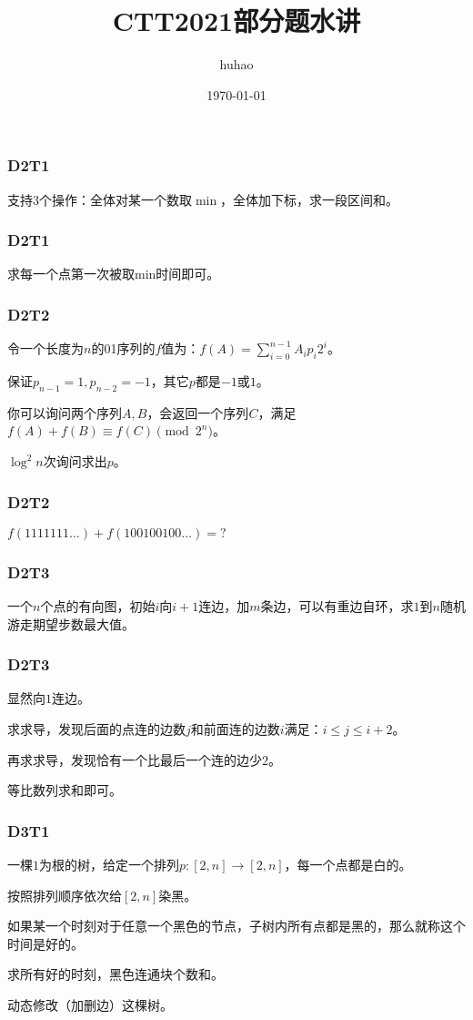 \documentclass[10pt]{beamer}
\begin{document}
	\title{CTT2021部分题水讲}
	\date{\today}
	\author{huhao}
	\maketitle
	\clearpage
	\begin{frame}
		\frametitle{D2T1}

		支持$3$个操作：全体对某一个数取$\min$，全体加下标，求一段区间和。

	\end{frame}
	\clearpage
	\begin{frame}
		\frametitle{D2T1}
	
		求每一个点第一次被取min时间即可。
	
	\end{frame}
	\clearpage
	\begin{frame}
		\frametitle{D2T2}
	
		令一个长度为$n$的01序列的$f$值为：$f(A)=\sum_{i=0}^{n-1}A_ip_i2^i$。

		保证$p_{n-1}=1,p_{n-2}=-1$，其它$p$都是$-1$或$1$。

		你可以询问两个序列$A,B$，会返回一个序列$C$，满足$f(A)+f(B)\equiv f(C) \pmod {2^n}$。

		$\log^2n$次询问求出$p$。
	
	\end{frame}
	\clearpage
	\begin{frame}
		\frametitle{D2T2}
	
		$f(1111111\dots)+f(100100100\dots)=?$
	
	\end{frame}
	\clearpage
	\begin{frame}
		\frametitle{D2T3}
	
		一个$n$个点的有向图，初始$i$向$i+1$连边，加$m$条边，可以有重边自环，求$1$到$n$随机游走期望步数最大值。
	
	\end{frame}
	\clearpage
	\begin{frame}
		\frametitle{D2T3}
	
		显然向$1$连边。

		求求导，发现后面的点连的边数$j$和前面连的边数$i$满足：$i\le j\le i+2$。

		再求求导，发现恰有一个比最后一个连的边少$2$。

		等比数列求和即可。
	
	\end{frame}
	\clearpage
	\begin{frame}
		\frametitle{D3T1}
	
		一棵$1$为根的树，给定一个排列$p:[2,n]\rightarrow [2,n]$，每一个点都是白的。

		按照排列顺序依次给$[2,n]$染黑。

		如果某一个时刻对于任意一个黑色的节点，子树内所有点都是黑的，那么就称这个时间是好的。

		求所有好的时刻，黑色连通块个数和。

		动态修改（加删边）这棵树。
	\end{frame}
\end{document}
